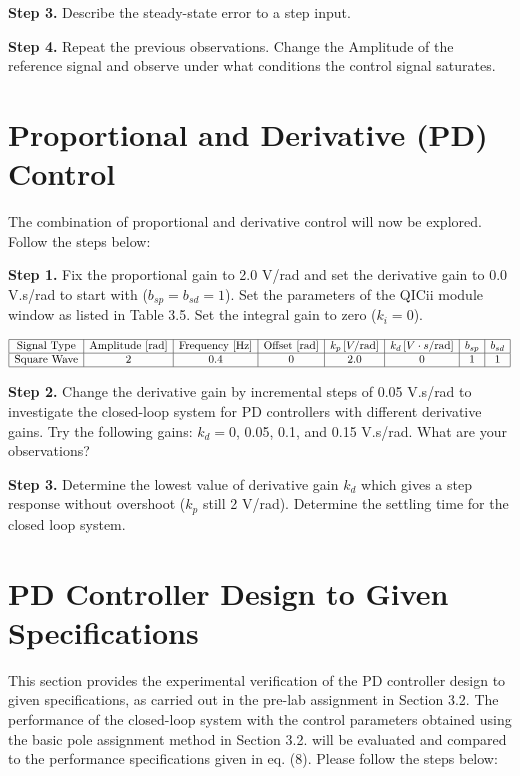 \documentclass{article}
\begin{document}
\textbf{Step 3.} Describe the steady-state error to a step input.

\textbf{Step 4.} Repeat the previous observations. Change the Amplitude of the reference signal and observe under what conditions the control signal saturates.
\section{Proportional and Derivative (PD) Control}

The combination of proportional and derivative control will now be explored. Follow the steps below:

\textbf{Step 1.} Fix the proportional gain to 2.0 V/rad and set the derivative gain to 0.0 V.s/rad to start with (\(b_{sp} = b_{sd} = 1\)). Set the parameters of the QICii module window as listed in Table 3.5. Set the integral gain to zero (\(k_i = 0\)).

\[
\begin{array}{|c|c|c|c|c|c|c|c|}
\hline
\text{Signal Type} & \text{Amplitude [rad]} & \text{Frequency [Hz]} & \text{Offset [rad]} & k_p \, [V/\text{rad}] & k_d \, [V\cdot s/\text{rad}] & b_{sp} & b_{sd} \\
\hline
\text{Square Wave} & 2 & 0.4 & 0 & 2.0 & 0 & 1 & 1 \\
\hline
\end{array}
\]
\begin{center}
\end{center}

\textbf{Step 2.} Change the derivative gain by incremental steps of 0.05 V.s/rad to investigate the closed-loop system for PD controllers with different derivative gains. Try the following gains: \( k_d = 0 \), 0.05, 0.1, and 0.15 V.s/rad. What are your observations?

\textbf{Step 3.} Determine the lowest value of derivative gain \( k_d \) which gives a step response without overshoot (\(k_p\) still 2 V/rad). Determine the settling time for the closed loop system.

\section{PD Controller Design to Given Specifications}

This section provides the experimental verification of the PD controller design to given specifications, as carried out in the pre-lab assignment in Section 3.2. The performance of the closed-loop system with the control parameters obtained using the basic pole assignment method in Section 3.2. will be evaluated and compared to the performance specifications given in eq. (8). Please follow the steps below:
\end{document}

